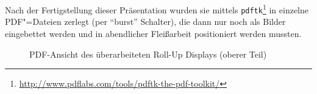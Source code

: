 \documentclass[12pt,ngerman]{dtk}
\begin{document}
Nach der Fertigstellung dieser Präsentation wurden sie mittels \texttt{pdftk}\footnote{\url{http://www.pdflabs.com/tools/pdftk-the-pdf-toolkit/}}  in einzelne PDF"=Dateien zerlegt (per \enquote{burst} Schalter), die dann nur noch als Bilder eingebettet werden und in abendlicher Fleißarbeit positioniert werden mussten. 

\begin{figure}
\centering
{}
\caption{PDF-Ansicht des überarbeiteten Roll-Up Displays (oberer Teil)}
\end{figure}
\end{document}
